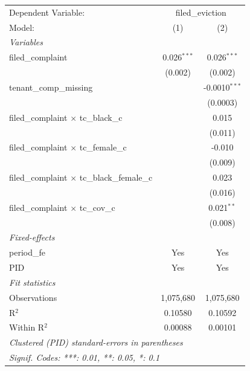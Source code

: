\begingroup
\centering
\begin{tabular}{lcc}
   \tabularnewline \midrule \midrule
   Dependent Variable: & \multicolumn{2}{c}{filed\_eviction}\\
   Model:                                              & (1)           & (2)\\  
   \midrule
   \emph{Variables}\\
   filed\_complaint                                    & 0.026$^{***}$ & 0.026$^{***}$\\   
                                                       & (0.002)       & (0.002)\\   
   tenant\_comp\_missing                               &               & -0.0010$^{***}$\\   
                                                       &               & (0.0003)\\   
   filed\_complaint $\times$ tc\_black\_c              &               & 0.015\\   
                                                       &               & (0.011)\\   
   filed\_complaint $\times$ tc\_female\_c             &               & -0.010\\   
                                                       &               & (0.009)\\   
   filed\_complaint $\times$ tc\_black\_female\_c      &               & 0.023\\   
                                                       &               & (0.016)\\   
   filed\_complaint $\times$ tc\_cov\_c                &               & 0.021$^{**}$\\   
                                                       &               & (0.008)\\   
   \midrule
   \emph{Fixed-effects}\\
   period\_fe                                          & Yes           & Yes\\  
   PID                                                 & Yes           & Yes\\  
   \midrule
   \emph{Fit statistics}\\
   Observations                                        & 1,075,680     & 1,075,680\\  
   R$^2$                                               & 0.10580       & 0.10592\\  
   Within R$^2$                                        & 0.00088       & 0.00101\\  
   \midrule \midrule
   \multicolumn{3}{l}{\emph{Clustered (PID) standard-errors in parentheses}}\\
   \multicolumn{3}{l}{\emph{Signif. Codes: ***: 0.01, **: 0.05, *: 0.1}}\\
\end{tabular}
